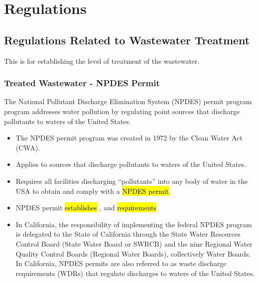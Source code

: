 \chapter{Regulations}
\section{Regulations Related to Wastewater Treatment}
This is for establishing the level of treatment of the wastewater.
\subsection{Treated Wastewater - NPDES Permit}
The National Pollutant Discharge Elimination System (NPDES) permit program program addresses water pollution by regulating point sources that discharge pollutants to waters of the United States.

\begin{itemize}
\item The NPDES permit program was created in 1972 by the Clean Water Act (CWA).
\item Applies to sources that discharge pollutants to waters of the United States.
\item Requires all facilities discharging “pollutants” into any body of water in the USA to obtain and comply with a \hl{NPDES permit}.
\item NPDES permit \hl{establishes} ,  and  \hl{requirements}\\
\item In California, the responsibility of implementing the federal NPDES program is delegated to the State of California through the State Water Resources Control Board (State Water Board or SWRCB) and the nine Regional Water Quality Control Boards (Regional Water Boards), collectively Water Boards. In California, NPDES permits are also referred to as waste discharge requirements (WDRs) that regulate discharges to waters of the United States.
\end{itemize}

